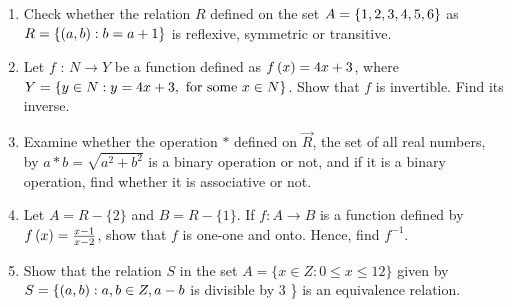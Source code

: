 \begin{enumerate}
\item Check whether the relation $R$ defined on the set $A=\left\{1,2,3,4,5,6\right\}$ as $R =\left\{(a, b) : b = a + 1\right\}$ is reflexive, symmetric or transitive.

\item Let $f$ : $N\rightarrow Y $ be a function defined as $f\left(x\right)= 4x + 3$, where $Y=\left\{y\in N:y=4x+3, \text{ for some } x\in N\right\}$. Show that $f$ is invertible. Find its inverse.

\item Examine whether the operation $*$ defined on $\vec{R}$, the set of all real numbers, by $a * b = \sqrt{a^2+b^2}$ is a binary operation or not, and if it is a binary operation, find whether it is associative or not.

\item Let $A= R - \{2\}$ and $B = R - \{1\}$. If $f : A \rightarrow B$ is a function defined by $f\left(x\right)=\frac{x-1}{x-2}$, show that $f$ is one-one and onto. Hence, find $f^{-1}$.

\item Show that the relation $S$ in the set $A = \{x \in Z : 0  \le x  \le 12\}$ given by $S= \{\left(a, b\right) : a, b \in Z, a-b $ is divisible by $ 3 $ \} is an equivalence relation.
\end{enumerate}      
